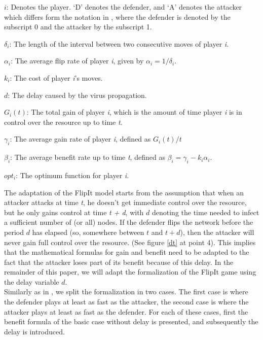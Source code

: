 \begin{description}
\item $i$: Denotes the player. `D' denotes the defender, and `A' denotes the attacker which differs form the notation in \citep{FlipIt}, where the defender is denoted by the subscript 0 and the attacker by the subscript 1.
\item $\delta_{i}$: The length of the interval between two consecutive moves of player \textit{i}. 
\item $\alpha_{i}$: The average flip rate of player \textit{i}, given by $\alpha_{i}=1/\delta_{i}$.
\item $k_{i}$: The cost of player \textit{i}'s moves.
\item $d$: The delay caused by the virus propagation.
\item $G_{i}(t)$: The total gain of player \textit{i}, which is the amount of time player \textit{i} is in control over the resource up to time \textit{t}.
\item $\gamma_{i}$: The average gain rate of player \textit{i}, defined as $G_{i}(t)/t$
\item $\beta_{i}$:  The average benefit rate up to time \textit{t}, defined as  $\beta_{i} = \gamma_{i} -k_{i} \alpha_{i} $.
\item $opt_{i}$: The optimum function for player \textit{i}. 
\end{description}

The adaptation of the FlipIt model starts from the assumption that when an attacker attacks at time \textit{t}, he doesn't get immediate control over the resource, but he only gains control at time \textit{t + d}, with $d$ denoting the time needed to infect a sufficient number of (or all) nodes. If the defender flips the network before the period $d$ has elapsed (so, somewhere between $t$ and $t + d$), then the attacker will never gain full control over the resource. (See figure \ref{dt} at point 4). This implies that the mathematical formulas for gain and benefit need to be adapted to the fact that the attacker loses part of its benefit because of this delay. In the remainder of this paper, we will adapt the formalization of the FlipIt game using the delay variable $d$. \\ 


Similarly as in \cite{FlipIt}, we split the formalization in two cases. The first case is where the defender plays at least as fast as the attacker, the second case is where the attacker plays at least as fast as the defender. For each of these cases, first the benefit formula of the basic case without delay is presented, and subsequently the delay is introduced.  \\

